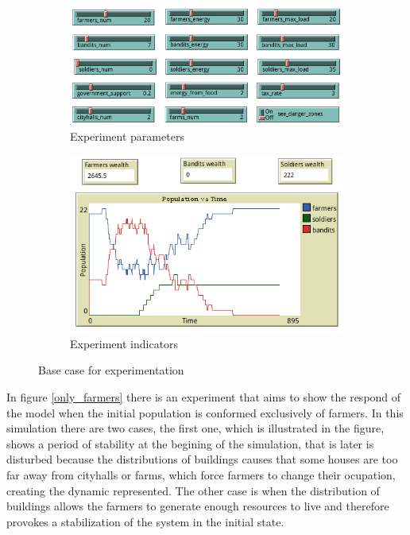\documentclass{wscpaperproc}
\begin{document}
\begin{figure}[h!]
    \begin{subfigure}{0.45\textwidth}
    \includegraphics[width=\textwidth]{Images/Exp1_sliders.png}
    \caption{Experiment parameters}
    \end{subfigure}
    \hfill
    \begin{subfigure}{0.45\textwidth}
    \includegraphics[width=\textwidth]{Images/Exp1_indicators.png}
    \caption{Experiment indicators}
    \end{subfigure}%
    \caption{Base case for experimentation}
    \label{base_experiment}
\end{figure}

In figure \ref{only_farmers} there is an experiment that aims to show the respond
of the model when the initial population is conformed exclusively of farmers. In
this simulation there are two cases, the first one, which is illustrated in the
figure, shows a period of stability at the begining of the simulation, that is
later is disturbed because the distributions of buildings causes that
some houses are too far away from cityhalls or farms, which force
farmers to change their ocupation, creating the dynamic represented. The other case
is when the distribution of buildings allows the farmers to generate enough
resources to live and therefore provokes a stabilization of the system in the
initial state.\\
\end{document}
